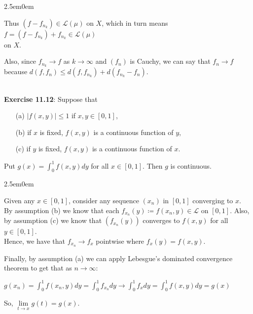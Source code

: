 \documentclass{book}
\newcommand{\exTwo}{%
   \color{RedViolet}%
   \fontsize{13}{15}\selectfont%
}
\newenvironment{myIndent}{%
   \begin{adjustwidth}{2.5em}{0em}%
}{%
   \end{adjustwidth}%
}
\newcommand{\mySepTwo}[1][.]{%
   {\noindent\color{#1}{\rule{6.5in}{0.5mm}}}\\%
}
\newcommand{\retTwo}{\hfill\bigbreak}
\begin{document}
{\begin{myIndent}
   Thus $(f - f_{n_k}) \in \mathscr{L}(\mu)$ on $X$, which in turn means $f = (f - f_{n_k}) + f_{n_k} \in \mathscr{L}(\mu)$\\ on $X$.\retTwo

   Also, since $f_{n_k} \rightarrow f$ as $k \rightarrow \infty$ and $(f_n)$ is Cauchy, we can say that $f_n \rightarrow f$\\ because $d(f, f_n) \leq d(f, f_{n_k}) + d(f_{n_k} - f_n)$.\retTwo
\end{myIndent}}

\mySepTwo

\textbf{Exercise 11.12}: Suppose that\\ [-20pt]
\begin{itemize}
   \item[(a)] $|f(x, y)| \leq 1$ if $x, y \in [0, 1]$,\\ [-20pt]
   \item[(b)] if $x$ is fixed, $f(x, y)$ is a continuous function of $y$,\\ [-20pt]
   \item[(c)] if $y$ is fixed, $f(x, y)$ is a continuous function of $x$. 
\end{itemize}

Put $g(x) = \int_{0}^{1}f(x,y)dy$ for all $x \in [0, 1]$. Then $g$ is continuous.\\ [-6pt]

{\begin{myIndent}\exTwo
   Given any $x \in [0, 1]$, consider any sequence $(x_n)$ in $[0, 1]$ converging to $x$.\\ By assumption (b) we know that each $f_{x_n}(y) \coloneq f(x_n, y) \in \mathscr{L}$ on $[0, 1]$. Also,\\ by assumption (c) we know that $(f_{x_n}(y))$ converges to $f(x, y)$ for all $y \in [0, 1]$.\\ Hence, we have that $f_{x_n} \rightarrow f_x$ pointwise where $f_x(y) = f(x, y)$.\retTwo

   Finally, by assumption (a) we can apply Lebesgue's dominated convergence\\ theorem to get that as $n \rightarrow \infty$:

   {\centering $g(x_n) = \int_{0}^1 f(x_n, y)dy = \int_{0}^1 f_{x_n}dy \rightarrow \int_0^1 f_xdy = \int_0^1 f(x, y)dy = g(x)$ \retTwo\par}

   So, $\lim\limits_{t\rightarrow x}g(t) = g(x)$.\retTwo
\end{myIndent}}
\end{document}
